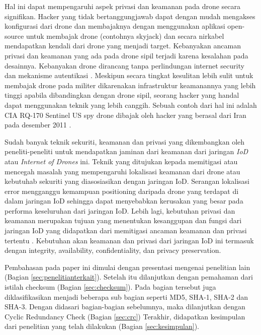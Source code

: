 Hal ini dapat mempengaruhi aspek privasi dan keamanan pada drone secara signifikan. Hacker yang tidak bertanggungjawab dapat dengan mudah mengakses konfigurasi dari drone dan membajaknya dengan menggunakan aplikasi open-source untuk membajak drone (contohnya skyjack) dan secara nirkabel mendapatkan kendali dari drone yang menjadi target. Kebanyakan ancaman privasi dan keamanan yang ada pada drone sipil terjadi karena kesalahan pada desainnya. Kebanyakan drone dirancang tanpa perlindungan internet security dan mekanisme autentikasi \citep{rahman2017smart}. Meskipun secara tingkat kesulitan lebih sulit untuk membajak drone pada militer dikarenakan infrastruktur keamanannya yang lebih tinggi apabila dibandingkan dengan drone sipil, seorang hacker yang handal dapat menggunakan teknik yang lebih canggih. Sebuah contoh dari hal ini adalah CIA RQ-170 Sentinel US spy drone dibajak oleh hacker yang berasal dari Iran pada desember 2011 \citep{mohan2016cybersecurity}.

Sudah banyak teknik sekuriti, keamanan dan privasi yang dikembangkan oleh peneliti-peneliti untuk mendapatkan jaminan dari keamanan dari jaringan \emph{IoD} atau \emph{Internet of Drones} ini. Teknik yang ditujukan kepada memitigasi atau mencegah masalah yang mempengaruhi lokalisasi keamanan dari drone atau kebutuhab sekuriti yang diasosiasikan dengan jaringan IoD. Serangan lokalisasi error mengganggu kemampuan positioning daripada drone yang terdapat di dalam jaringan IoD sehingga dapat menyebabkan kerusakan yang besar pada performa keseluruhan dari jaringan IoD. Lebih lagi, kebutuhan privasi dan keamanan merupakan tujuan yang menentukan kesanggupan dan fungsi dari jaringan IoD yang didapatkan dari memitigasi ancaman keamanan dan privasi tertentu \citep{yahuza2020systematic}. Kebutuhan akan keamanan dan privasi dari jaringan IoD ini termasuk dengan integrity, availability, confidentiality, dan privacy preservation.

Pembahasan pada paper ini dimulai dengan presentasi mengenai penelitian lain (Bagian \ref{sec:penelitianterkait}).
Setelah itu dilanjutkan dengan pemahaman dari istilah checksum (Bagian \ref{sec:checksum}). Pada bagian tersebut juga diklasifikasikan menjadi beberapa sub bagian seperti MD5, SHA-1, SHA-2 dan SHA-3.
Dengan didasari bagian-bagian sebelumnya, maka dilanjutkan dengan Cyclic Redundancy Check  (Bagian \ref{sec:crc})
Terakhir, didapatkan kesimpulan dari penelitian yang telah dilakukan (Bagian \ref{sec:kesimpulan}).
